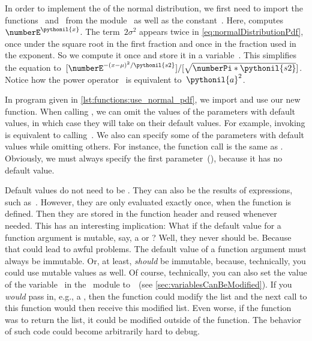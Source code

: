 In order to implement the  of the normal distribution, we first need to import the functions~ and~ from the module~ as well as the constant~.
Here,  computes~$\numberE^{\pythonil{x}}$.
The term~$2\sigma^2$ appears twice in \cref{eq:normalDistributionPdf}, once under the square root in the first fraction and once in the fraction used in the exponent.
So we compute it once and store it in a variable~.
This simplifies the equation to~$[\numberE^{-(x-\mu)^2 / \pythonil{s2}}]/[\sqrt{\numberPi*\pythonil{s2}}]$.
Notice how the power operator~\pythonIdx{**} is equivalent to~$\pythonil{a}^2$.

In program  given in \cref{lst:functions:use_normal_pdf}, we import and use our new  function.
When calling , we can omit the values of the parameters with default values, in which case they will take on their default values.
For example, invoking  is equivalent to calling~.
We also can specify some of the parameters with default values while omitting others.
For instance, the function call  is the same as .
Obviously, we must always specify the first parameter~(), because it has no default value.

Default values do not need to be .
They can also be the results of expressions, such as~.
However, they are only evaluated exactly once, when the function is defined.
Then they are stored in the function header and reused whenever needed.
This has an interesting implication:
What if the default value for a function argument is mutable, say, a  or ?
Well, they never should be.
Because that could lead to awful problems.
%
%
%
The default value of a function argument must always be immutable.
Or, at least, \emph{should} be immutable, because, technically, you could use mutable values as well.
Of course, technically, you can also set the value of the variable~ in the ~module to~~(see \cref{sec:variablesCanBeModified}).
If you \emph{would} pass in, e.g., a , then the function could modify the list and the next call to this function would then receive this modified list.
Even worse, if the function was to return the list, it could be modified outside of the function.
The behavior of such code could become arbitrarily hard to debug.


